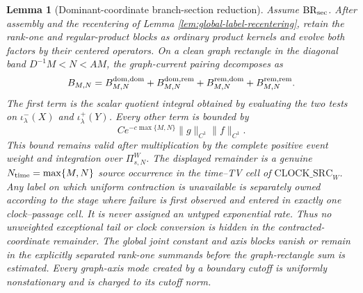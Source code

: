 \documentclass[11pt]{article}
\newtheorem{lemma}[theorem]{Lemma}
\begin{document}
\begin{lemma}[Dominant-coordinate branch-section reduction]
\label{lem:dominant-coordinate-reduction}
Assume $\mathrm{BR}_{\rm sec}$.  After assembly and the recentering of Lemma
\ref{lem:global-label-recentering}, retain the rank-one and regular-product
blocks as ordinary product kernels and evolve both factors by their centered
operators.
On a clean graph rectangle in the diagonal band
$D^{-1}M<N<AM$, the graph-current pairing decomposes as
\begin{equation}
\label{eq:dominant-coordinate-decomposition}
 B_{M,N}=B^{\rm dom,dom}_{M,N}
 +B^{\rm dom,rem}_{M,N}+B^{\rm rem,dom}_{M,N}
 +B^{\rm rem,rem}_{M,N}.
\end{equation}
The first term is the scalar quotient integral obtained by evaluating the two
tests on $\iota^-_\lambda(X)$ and $\iota^+_\lambda(Y)$.
Every other term is bounded by
\begin{equation}
\label{eq:contracted-coordinate-error}
 Ce^{-c\max\{M,N\}}\|g\|_{C^1}\|f\|_{C^1}.
\end{equation}
This bound remains valid after multiplication by the complete positive event
weight and integration over $\Pi_{s,N}^{W}$.  The displayed remainder is a
genuine $N_{\rm time}=\max\{M,N\}$ source occurrence in the time--TV cell
of $\mathrm{CLOCK\_SRC}_{W}$.  Any label on which uniform contraction is
unavailable is separately owned according to the stage where failure is
first observed and entered in exactly one clock--passage cell.  It is never
assigned an untyped exponential rate.  Thus no unweighted exceptional tail
or clock conversion is hidden in the contracted-coordinate remainder.
The global joint constant and axis blocks vanish or remain in the explicitly
separated rank-one summands before the graph-rectangle sum is estimated.
Every graph-axis mode created by a boundary cutoff is uniformly
nonstationary and is charged to its cutoff norm.
\end{lemma}
\end{document}
